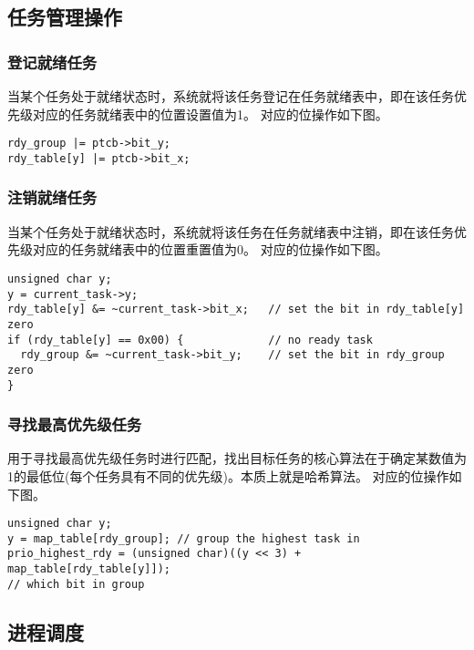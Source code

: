\subsection{任务管理操作}

\subsubsection{登记就绪任务}

当某个任务处于就绪状态时，系统就将该任务登记在任务就绪表中，即在该任务优先级对应的任务就绪表中的位置设置值为1。
对应的位操作如下图。

\begin{lstlisting}[caption=登记就绪任务操作]
rdy_group |= ptcb->bit_y;
rdy_table[y] |= ptcb->bit_x;
\end{lstlisting}


\subsubsection{注销就绪任务}

当某个任务处于就绪状态时，系统就将该任务在任务就绪表中注销，即在该任务优先级对应的任务就绪表中的位置重置值为0。
对应的位操作如下图。

\begin{lstlisting}[caption=注销就绪任务操作]
unsigned char y;
y = current_task->y;
rdy_table[y] &= ~current_task->bit_x;   // set the bit in rdy_table[y] zero
if (rdy_table[y] == 0x00) {             // no ready task
  rdy_group &= ~current_task->bit_y;    // set the bit in rdy_group zero
}
\end{lstlisting}

\subsubsection{寻找最高优先级任务}

用于寻找最高优先级任务时进行匹配，找出目标任务的核心算法在于确定某数值为1的最低位(每个任务具有不同的优先级)。本质上就是哈希算法。
对应的位操作如下图。

\begin{lstlisting}[caption=寻找最高优先级任务操作]
unsigned char y;
y = map_table[rdy_group]; // group the highest task in
prio_highest_rdy = (unsigned char)((y << 3) + map_table[rdy_table[y]]); 
// which bit in group
\end{lstlisting}



\subsection{进程调度}

